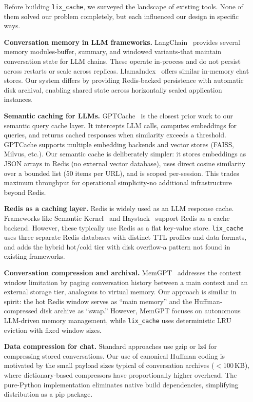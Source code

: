 \documentclass[conference]{IEEEtran}
\begin{document}
Before building \texttt{lix\_cache}, we surveyed the landscape of existing tools. None of them solved our problem completely, but each influenced our design in specific ways.

\textbf{Conversation memory in LLM frameworks.}
LangChain~\cite{langchain2023} provides several memory modules-buffer, summary, and windowed variants-that maintain conversation state for LLM chains. These operate in-process and do not persist across restarts or scale across replicas. LlamaIndex~\cite{llamaindex2023} offers similar in-memory chat stores. Our system differs by providing Redis-backed persistence with automatic disk archival, enabling shared state across horizontally scaled application instances.

\textbf{Semantic caching for LLMs.}
GPTCache~\cite{gptcache2023} is the closest prior work to our semantic query cache layer. It intercepts LLM calls, computes embeddings for queries, and returns cached responses when similarity exceeds a threshold. GPTCache supports multiple embedding backends and vector stores (FAISS, Milvus, etc.). Our semantic cache is deliberately simpler: it stores embeddings as JSON arrays in Redis (no external vector database), uses direct cosine similarity over a bounded list (50 items per URL), and is scoped per-session. This trades maximum throughput for operational simplicity-no additional infrastructure beyond Redis.

\textbf{Redis as a caching layer.}
Redis is widely used as an LLM response cache. Frameworks like Semantic Kernel~\cite{semantic_kernel2023} and Haystack~\cite{haystack2023} support Redis as a cache backend. However, these typically use Redis as a flat key-value store. \texttt{lix\_cache} uses three separate Redis databases with distinct TTL profiles and data formats, and adds the hybrid hot/cold tier with disk overflow-a pattern not found in existing frameworks.

\textbf{Conversation compression and archival.}
MemGPT~\cite{memgpt2023} addresses the context window limitation by paging conversation history between a main context and an external storage tier, analogous to virtual memory. Our approach is similar in spirit: the hot Redis window serves as ``main memory'' and the Huffman-compressed disk archive as ``swap.'' However, MemGPT focuses on autonomous LLM-driven memory management, while \texttt{lix\_cache} uses deterministic LRU eviction with fixed window sizes.

\textbf{Data compression for chat.}
Standard approaches use gzip or lz4 for compressing stored conversations. Our use of canonical Huffman coding is motivated by the small payload sizes typical of conversation archives ($<$100\,KB), where dictionary-based compressors have proportionally higher overhead. The pure-Python implementation eliminates native build dependencies, simplifying distribution as a pip package.
\end{document}
